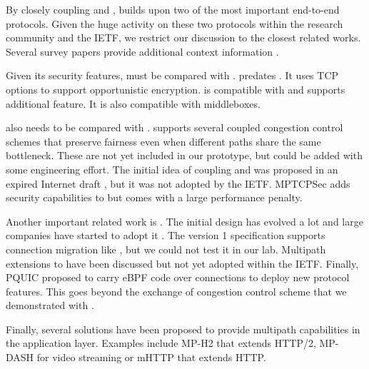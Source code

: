 
By closely coupling \tcp and \tls, \tcpls builds upon two of the most important end-to-end protocols. Given the huge activity on these two protocols within the research community and the IETF, we restrict our discussion to the closest
related works. Several survey papers provide additional context information \cite{polese2019survey,li2016multipath,papastergiou2016ossifying}.

Given its security features, \tcpls must be compared with \tcpcrypt \cite{bittau2010case,rfc8548}. \tcpcrypt predates . It uses TCP options to support opportunistic encryption. \tcpls is compatible with \tls and supports additional feature. It is also compatible with \tcp middleboxes.

\tcpls also needs to be compared with \mptcp \cite{raiciu2012hard,rfc6824}. \mptcp supports several coupled congestion control schemes \cite{peng2014multipath,wischik2011design,khalili2013mptcp} that preserve fairness even when different paths share the same bottleneck. These are not yet included in our \tcpls prototype, but could be added with some engineering effort. The initial idea of coupling \mptcp and \tls was proposed in an expired Internet draft \cite{draft-paasch-mptcp-ssl-00}, but it was not adopted by the IETF. MPTCPSec \cite{jadin2017securing} adds security capabilities to \mptcp but comes with a large performance penalty.

Another important related work is \quic. The initial design \cite{roskind2013quic} has evolved a lot and large companies have started to adopt it \cite{10.1145/3098822.3098842,Joras_mvfst,marx2020same}. The \quic version 1 specification \cite{draft-ietf-quic-transport} supports connection migration like \tcpls, but we could not test it in our lab. Multipath extensions \cite{viernickel2018multipath,de2017multipath,draft-deconinck-quic-multipath-06,draft-liu-multipath-quic-02} to \quic have been discussed but not yet adopted within the IETF. Finally, PQUIC \cite{de2019pluginizing} proposed to carry eBPF code over \quic connections to deploy new protocol features. This goes beyond the exchange of congestion control scheme that we demonstrated with \tcpls.

Finally, several solutions have been proposed to provide multipath capabilities in the application layer. Examples include MP-H2 \cite{nikravesh2019mp} that extends HTTP/2, MP-DASH \cite{han2016mp} for video streaming or mHTTP \cite{kim2014multi} that extends HTTP.




